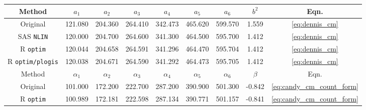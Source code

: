 
\begin{tabular}{ccccccccc}
\toprule
Method & $a_1$ & $a_2$ & $a_3$ & $a_4$ & $a_5$ & $a_6$ & $b^2$ & Eqn.\\
\midrule
Original \citep{kemp1986stochastic} & 121.080 & 204.360 & 264.410 & 342.473 & 465.620 & 599.570 & 1.559 & \ref{eq:dennis_cm}\\
SAS \verb+NLIN+ & 120.000 & 204.700 & 264.600 & 341.300 & 464.500 & 595.700 & 1.412 & \ref{eq:dennis_cm}\\
R \verb+optim+ & 120.044 & 204.658 & 264.591 & 341.296 & 464.470 & 595.704 & 1.412 & \ref{eq:dennis_cm}\\
R \verb+optim/plogis+ & 120.038 & 204.671 & 264.590 & 341.292 & 464.473 & 595.705 & 1.412 & \ref{eq:dennis_cm}\\
\midrule Method & $\alpha_1$ & $\alpha_2$ & $\alpha_3$ & $\alpha_4$ & $\alpha_5$ & $\alpha_6$ & $\beta$ & Eqn. \\ \midrule
Original \citep{candy1991modeling} & 101.000 & 172.200 & 222.700 & 287.200 & 390.900 & 501.300 & -0.842 & \ref{eq:candy_cm_count_form}\\
\addlinespace
R \verb+optim+ & 100.989 & 172.181 & 222.598 & 287.134 & 390.771 & 501.157 & -0.841 & \ref{eq:candy_cm_count_form}\\
\bottomrule
\end{tabular}